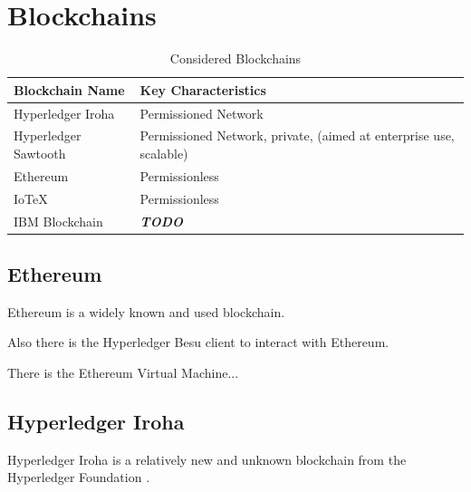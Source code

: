 \section{Blockchains} %
\label{sec:Blockchains}
\begin{table}
	\caption{Considered Blockchains}
	\label{tab:Considered Blockchains}
	\begin{center}
		\begin{tabular}[c]{|l|l|}
			\hline
			\textbf{Blockchain Name}                     & \textbf{Key Characteristics}                             \\
			\hline
			Hyperledger Iroha \cite{hyperledger:wiki}    & Permissioned Network                                     \\
			\hline
			Hyperledger Sawtooth \cite{hyperledger:wiki} & Permissioned Network, private, (aimed at enterprise use,
			scalable)                                                                                               \\
			\hline
			Ethereum                                     & Permissionless                                           \\
			\hline
			IoTeX \cite{iotex-bc-platform}               & Permissionless                                           \\
			\hline
			IBM Blockchain                               & \textbf{\textit{TODO}}                                   \\
			\hline
		\end{tabular}
	\end{center}
\end{table}

\subsection{Ethereum} %
\label{sub}

Ethereum is a widely known and used blockchain.

Also there is the Hyperledger Besu \cite{hyperledger:wiki} client to interact with Ethereum.

There is the Ethereum Virtual Machine...

\subsection{Hyperledger Iroha} %
\label{sub:Hyperledger Iroha}

Hyperledger Iroha is a relatively new and unknown blockchain from the Hyperledger Foundation \cite{hyperledger:wiki}.

